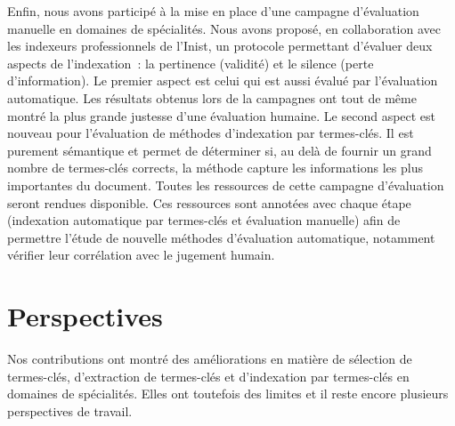     Enfin, nous avons participé à la mise en place d'une campagne d'évaluation
    manuelle en domaines de spécialités. Nous avons proposé, en collaboration
    avec les indexeurs professionnels de l'Inist, un protocole permettant
    d'évaluer deux aspects de l'indexation~: la pertinence (validité) et le
    silence (perte d'information). Le premier aspect est celui qui est aussi
    évalué par l'évaluation automatique. Les résultats obtenus lors de la
    campagnes ont tout de même montré la plus grande justesse d'une évaluation
    humaine. Le second aspect est nouveau pour l'évaluation de méthodes
    d'indexation par termes-clés. Il est purement sémantique et permet de
    déterminer si, au delà de fournir un grand nombre de termes-clés corrects,
    la méthode capture les informations les plus importantes du document. Toutes
    les ressources de cette campagne d'évaluation seront rendues disponible. Ces
    ressources sont annotées avec chaque étape (indexation automatique par
    termes-clés et évaluation manuelle) afin de permettre l'étude de nouvelle
    méthodes d'évaluation automatique, notamment vérifier leur corrélation
    avec le jugement humain.

  \section{Perspectives}
  \label{sec:main-conclusion-contributions}
    Nos contributions ont montré des améliorations en matière de sélection de
    termes-clés, d'extraction de termes-clés et d'indexation par termes-clés en
    domaines de spécialités. Elles ont toutefois des limites et il reste encore
    plusieurs perspectives de travail.

